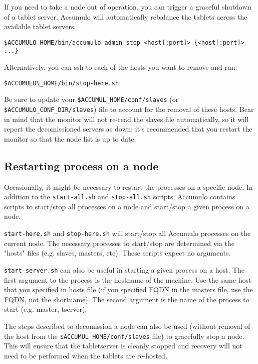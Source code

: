 If you need to take a node out of operation, you can trigger a graceful shutdown of a tablet 
server. Accumulo will automatically rebalance the tablets across the available tablet servers.

\begingroup\fontsize{8pt}{8pt}\selectfont\begin{verbatim}
$ACCUMULO_HOME/bin/accumulo admin stop <host[:port]> {<host[:port]> ...}
\end{verbatim}\endgroup

Alternatively, you can ssh to each of the hosts you want to remove and run:

\begingroup\fontsize{8pt}{8pt}\selectfont\begin{verbatim}
$ACCUMULO\_HOME/bin/stop-here.sh
\end{verbatim}\endgroup

Be sure to update your \texttt{\$ACCUMUL\_HOME/conf/slaves} (or \texttt{\$ACCUMULO\_CONF\_DIR/slaves}) file to 
account for the removal of these hosts. Bear in mind that the monitor will not re-read the 
slaves file automatically, so it will report the decomissioned servers as down; it's 
recommended that you restart the monitor so that the node list is up to date.

\subsection{Restarting process on a node}

Occasionally, it might be necessary to restart the processes on a specific node. In addition
to the \texttt{start-all.sh} and \texttt{stop-all.sh} scripts, Accumulo contains scripts to start/stop all processes
on a node and start/stop a given process on a node.

\texttt{start-here.sh} and \texttt{stop-here.sh} will start/stop all Accumulo processes on the current node. The
necessary processes to start/stop are determined via the "hosts" files (e.g. slaves, masters, etc).
These scripts expect no arguments.

\texttt{start-server.sh} can also be useful in starting a given process on a host.
The first argument to the process is the hostname of the machine. Use the same host that 
you specified in hosts file (if you specified FQDN in the masters file, use the FQDN, not
the shortname). The second argument is the name of the process to start (e.g. master, tserver).

The steps described to decomission a node can also be used (without removal of the host
from the \texttt{\$ACCUMUL\_HOME/conf/slaves} file) to gracefully stop a node. This will
ensure that the tabletserver is cleanly stopped and recovery will not need to be performed
when the tablets are re-hosted.

